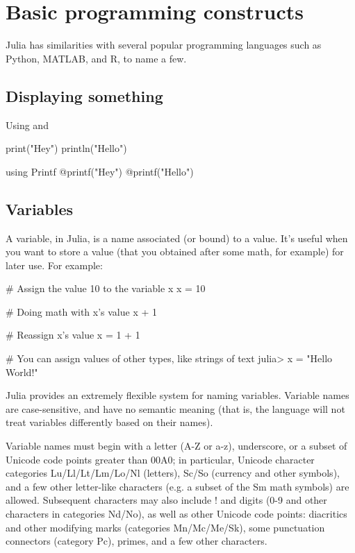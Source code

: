 \section{Basic programming constructs}

Julia has similarities with several popular programming languages
such as Python, MATLAB, and R, to name a few.

\subsection{Displaying something}

Using  and 

\begin{juliacode}
print("Hey")
println("Hello")
\end{juliacode}

\begin{juliacode}
using Printf
@printf("Hey")
@printf("Hello\n")
\end{juliacode}
  
\subsection{Variables}

A variable, in Julia, is a name associated (or bound) to a value.
It's useful when you want to store a value (that you obtained after some math,
for example) for later use. For example:

\begin{juliacode}
# Assign the value 10 to the variable x
x = 10
  
# Doing math with x's value
x + 1
  
# Reassign x's value
x = 1 + 1
  
# You can assign values of other types, like strings of text
julia> x = "Hello World!"
\end{juliacode}

Julia provides an extremely flexible system for naming variables.
Variable names are case-sensitive, and have no semantic meaning
(that is, the language will not treat variables differently based on their names).

Variable names must begin with a letter (A-Z or a-z), underscore, or a subset of Unicode code points greater than 00A0; in particular, Unicode character categories Lu/Ll/Lt/Lm/Lo/Nl (letters), Sc/So (currency and other symbols), and a few other letter-like characters (e.g. a subset of the Sm math symbols) are allowed. Subsequent characters may also include ! and digits (0-9 and other characters in categories Nd/No), as well as other Unicode code points: diacritics and other modifying marks (categories Mn/Mc/Me/Sk), some punctuation connectors (category Pc), primes, and a few other characters.

